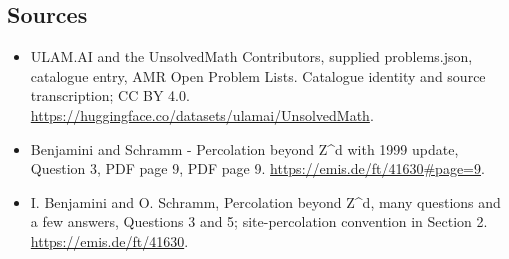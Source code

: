 \documentclass[11pt,a4paper]{article}
\begin{document}
\subsection{Sources}
\begin{itemize}
\item[S1] ULAM.AI and the UnsolvedMath Contributors, supplied problems.json, catalogue entry, AMR Open Problem Lists. Catalogue identity and source transcription; CC BY 4.0.
\url{https://huggingface.co/datasets/ulamai/UnsolvedMath}.
\item[S2] Benjamini and Schramm - Percolation beyond Z\textasciicircum{}d with 1999 update, Question 3, PDF page 9, PDF page 9. 
\url{https://emis.de/ft/41630#page=9}.
\item[S3] I. Benjamini and O. Schramm, Percolation beyond Z\textasciicircum{}d, many questions and a few answers, Questions 3 and 5; site-percolation convention in Section 2.
\url{https://emis.de/ft/41630}.
\end{itemize}
\end{document}
